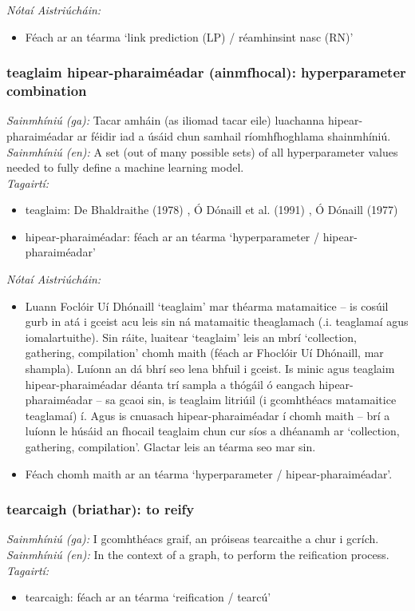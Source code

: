  \noindent \textit{Nótaí Aistriúcháin:}
\begin{itemize}
	\item Féach ar an téarma `link prediction (LP) / réamhinsint nasc (RN)'
\end{itemize}


\subsubsection*{teaglaim hipear-pharaiméadar (ainmfhocal): hyperparameter combination}
 \noindent \textit{Sainmhíniú (ga):} Tacar amháin (as iliomad tacar eile) luachanna hipear-pharaiméadar ar féidir iad a úsáid chun samhail ríomhfhoghlama shainmhíniú.
\\
 \noindent \textit{Sainmhíniú (en):} A set (out of many possible sets) of all hyperparameter values needed to fully define a machine learning model.
\\
 \noindent \textit{Tagairtí:}
\begin{itemize}
	\item teaglaim: De Bhaldraithe (1978) \cite{de-bhaldraithe}, Ó Dónaill et al. (1991) \cite{focloir-beag}, Ó Dónaill (1977) \cite{odonaill}
	\item hipear-pharaiméadar: féach ar an téarma `hyperparameter / hipear-pharaiméadar'
\end{itemize}

 \noindent \textit{Nótaí Aistriúcháin:}
\begin{itemize}
	\item Luann Foclóir Uí Dhónaill `teaglaim' mar théarma matamaitice -- is cosúil gurb in atá i gceist acu leis sin ná matamaitic theaglamach (.i. teaglamaí agus iomalartuithe). Sin ráite, luaitear `teaglaim' leis an mbrí `collection, gathering, compilation' chomh maith (féach ar Fhoclóir Uí Dhónaill, mar shampla). Luíonn an dá bhrí seo lena bhfuil i gceist. Is minic agus teaglaim hipear-pharaiméadar déanta trí sampla a thógáil ó eangach hipear-pharaiméadar -- sa gcaoi sin, is teaglaim litriúil (i gcomhthéacs matamaitice teaglamaí) í. Agus is cnuasach hipear-pharaiméadar í chomh maith -- brí a luíonn le húsáid an fhocail teaglaim chun cur síos a dhéanamh ar `collection, gathering, compilation'. Glactar leis an téarma seo mar sin.
	\item Féach chomh maith ar an téarma `hyperparameter / hipear-pharaiméadar'.
\end{itemize}


\subsubsection*{tearcaigh (briathar): to reify}
 \noindent \textit{Sainmhíniú (ga):} I gcomhthéacs graif, an próiseas tearcaithe a chur i gcrích.
\\
 \noindent \textit{Sainmhíniú (en):} In the context of a graph, to perform the reification process.
\\
 \noindent \textit{Tagairtí:}
\begin{itemize}
	\item tearcaigh: féach ar an téarma `reification / tearcú'
\end{itemize}

